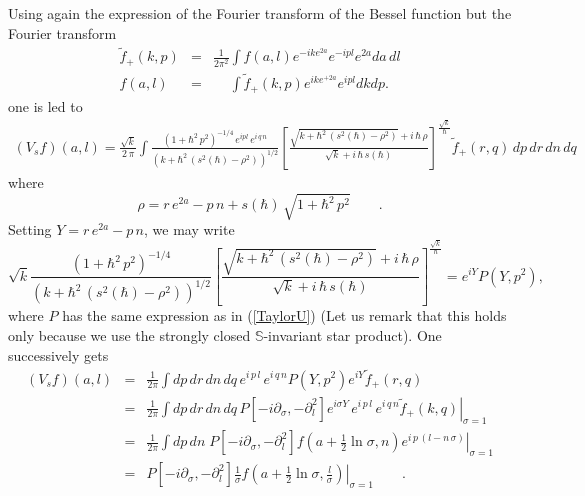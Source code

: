 \documentclass{article}
\renewcommand{\SS}{\mathbb S}
\newcommand{\p}{\partial}
\def \p{{\partial}}
\newcommand{\re}[1]{(\ref{#1})}
\begin{document}
\noindent Using again the expression of the Fourier transform of the Bessel function but   the Fourier transform
\begin{eqnarray}
 \tilde{f}_+ (k,p) &=& \frac{1}{2\pi^2} \int f(a,l) e^{-i k e^{2a}} e^{-ipl} e^{2a} da\, dl \label{Fourierplus}\\
  f(a,l) &=& \phantom{\frac{1}{2\pi^2}}\int \tilde{f}_+ (k,p) e^{i k e^{+2a}} e^{i p l} dk dp.
\end{eqnarray}
 one is led to
\begin{eqnarray}\label{VsDev}
 (V_s f)(a,l)  =\frac{\sqrt{k}}{2\,\pi}\int \frac{(1+\hbar^2\, p^2)^{-1/4}\,e^{i p l}\, e^{i \,q\, n}}{(k +   \hbar^2\,(s^2(\hbar) - \rho^2))^{1/2}} \left[\frac{\sqrt{k +  \hbar^2 \,(s^2(\hbar) - \rho^2)} + i  \,\hbar\,\rho }{\sqrt{k} +  i \, \hbar\, s(\hbar)} \right]^{\frac{\sqrt{k}}{ \hbar}}  \tilde{f}_+ (r,q)\,dp\,dr\,dn\,dq
\end{eqnarray}
where
\begin{equation}
 \rho =  {r\, e^{2a} - p\, n}  + s(\hbar)\, \sqrt{1+\hbar^2 \,p^2}\qquad.
\end{equation}
Setting $Y = r\, e^{2a} - p\, n$, we may write
\begin{equation}
\sqrt{k} \frac{(1+\hbar^2\, p^2)^{-1/4} }{(k +  \hbar^2\,(s^2(\hbar) - \rho^2))^{1/2}} \left[\frac{\sqrt{k +  \hbar^2 \,(s^2(\hbar) - \rho^2)} + i \, \hbar\,\rho }{\sqrt{k} +  i \,\hbar\, s(\hbar)} \right]^{\frac{\sqrt{k}}{ \hbar}} = e^{i Y} P(Y,p^2),
\end{equation}
where $P$ has the same expression as in \re{TaylorU} (Let us remark that this holds only  because we use the strongly closed $\SS$-invariant star product).
One successively gets
\begin{eqnarray}
 (V_s f)(a,l)  &=& \frac{1}{2\pi} \int dp \, dr\, dn \,dq \, e^{i \,p\, l} \,e^{i\,q\,n} P(Y,p^2) e^{iY} \tilde{f} _+(r,q) \nonumber \\
               &=&   \frac{1}{2\pi} \int dp \, dr\, dn \,dq \,  P[-i \p_\sigma,-\p^2_l] e^{i \sigma Y} \, e^{i \,p\, l} \,e^{i\,q\,n}\left . \tilde{f}_+ (k,q)\right\vert_{\sigma=1} \nonumber\\
               &=& \frac{1}{2\pi} \int dp \,dn \;  P[-i \p_\sigma,-\p^2_l]\left. f(a+\frac{1}{2} \ln\sigma,n) e^{i\,p\,(l-n\,\sigma)} \right\vert_{\sigma=1}\nonumber\\
               &=& P[-i \p_\sigma,-\p^2_l] \frac{1}{\sigma}\left. f(a+\frac{1}{2} \ln\sigma,\frac{l}{\sigma})\right\vert_{\sigma=1} \qquad .
\end{eqnarray}
\end{document}

